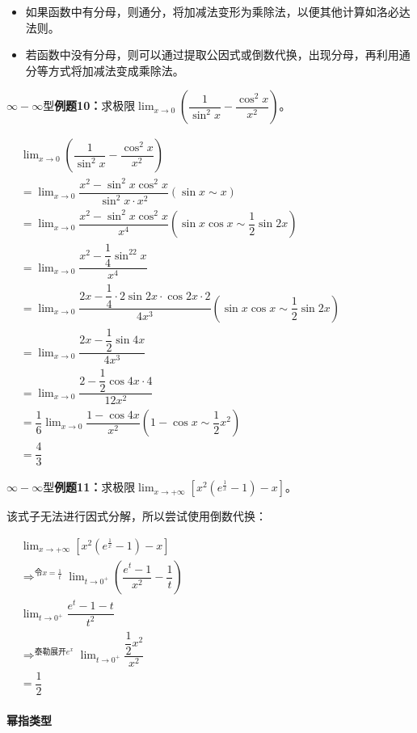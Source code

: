 \documentclass[UTF8]{ctexart}
\begin{document}
\begin{itemize}
    \item 如果函数中有分母，则通分，将加减法变形为乘除法，以便其他计算如洛必达法则。
    \item 若函数中没有分母，则可以通过提取公因式或倒数代换，出现分母，再利用通分等方式将加减法变成乘除法。
\end{itemize}

$\infty-\infty$型\textbf{例题10：}求极限$\lim_{x\to 0}\left(\dfrac{1}{\sin^2x}-\dfrac{\cos^2x}{x^2}\right)$。

$
\begin{aligned}
    & \lim_{x\to 0}\left(\dfrac{1}{\sin^2x}-\dfrac{\cos^2x}{x^2}\right) \\
    & = \lim_{x\to 0}\dfrac{x^2-\sin^2x\cos^2x}{\sin^2x\cdot x^2} (\sin x\sim x)\\
    & = \lim_{x\to 0}\dfrac{x^2-\sin^2x\cos^2x}{x^4} (\sin x\cos x\sim\dfrac{1}{2}\sin 2x)\\
    & = \lim_{x\to 0}\dfrac{x^2-\dfrac{1}{4}\sin^22x}{x^4} \\
    & = \lim_{x\to 0}\dfrac{2x-\dfrac{1}{4}\cdot 2\sin 2x\cdot\cos 2x\cdot 2}{4x^3} (\sin x\cos x\sim\dfrac{1}{2}\sin 2x)\\
    & = \lim_{x\to 0}\dfrac{2x-\dfrac{1}{2}\sin 4x}{4x^3} \\
    & = \lim_{x\to 0}\dfrac{2-\dfrac{1}{2}\cos 4x\cdot 4}{12x^2} \\
    & = \dfrac{1}{6}\lim_{x\to 0}\dfrac{1-\cos 4x}{x^2} (1-\cos x\sim \dfrac{1}{2}x^2)\\
    & = \dfrac{4}{3}
\end{aligned}
$

$\infty-\infty$型\textbf{例题11：}求极限$\lim_{x\to+\infty}[x^2(e^{\frac{1}{x}}-1)-x]$。

该式子无法进行因式分解，所以尝试使用倒数代换：

$
\begin{aligned}
    & \lim_{x\to+\infty}[x^2(e^{\frac{1}{x}}-1)-x] \\
    & \Rightarrow^{\text{令}x=\frac{1}{t}}\lim_{t\to 0^+}\left(\dfrac{e^t-1}{x^2}-\dfrac{1}{t}\right) \\
    & \lim_{t\to 0^+}\dfrac{e^t-1-t}{t^2} \\
    & \Rightarrow^{\text{泰勒展开}e^x}\lim_{t\to 0^+}\dfrac{\dfrac{1}{2}x^2}{x^2} \\
    & =\dfrac{1}{2}
\end{aligned}
$

\paragraph{幂指类型} \leavevmode \bigskip
\end{document}
